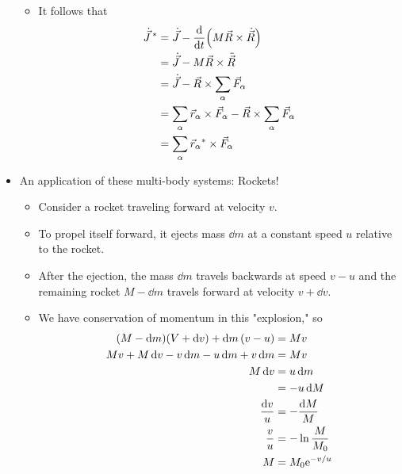 \documentclass[../notes.tex]{subfiles}
\begin{document}
\begin{itemize}
\begin{itemize}
\begin{equation*}
        \end{equation*}
        \item It follows that
        \begin{align*}
            \dot{\vec{J}}{\,}^* &= \dot{\vec{J}}-\dv{t}(M\vec{R}\times\dot{\vec{R}})\\
            &= \dot{\vec{J}}-M\vec{R}\times\ddot{\vec{R}}\\
            &= \dot{\vec{J}}-\vec{R}\times\sum_\alpha\vec{F}_\alpha\\
            &= \sum_\alpha\vec{r}_\alpha\times\vec{F}_\alpha-\vec{R}\times\sum_\alpha\vec{F}_\alpha\\
            &= \sum_\alpha\vec{r}_\alpha{}^*\times\vec{F}_\alpha
        \end{align*}
    \end{itemize}
    \item An application of these multi-body systems: Rockets!
    \begin{itemize}
        \item Consider a rocket traveling forward at velocity $v$.
        \item To propel itself forward, it ejects mass $\dd{m}$ at a constant speed $u$ relative to the rocket.
        \item After the ejection, the mass $\dd{m}$ travels backwards at speed $v-u$ and the remaining rocket $M-\dd{m}$ travels forward at velocity $v+\dd{v}$.
        \item We have conservation of momentum in this "explosion," so
        \begin{align*}
            (M-\dd{m})(V+\dd{v})+\dd{m}(v-u) &= Mv\\
            Mv+M\dd{v}-v\dd{m}-u\dd{m}+v\dd{m} &= Mv\\
            M\dd{v} &= u\dd{m}\\
            &= -u\dd{M}\\
            \frac{\dd{v}}{u} &= -\frac{\dd{M}}{M}\\
            \frac{v}{u} &= -\ln\frac{M}{M_0}\\
            M &= M_0\e[-v/u]
        \end{align*}
    \end{itemize}
\end{itemize}




\end{document}
